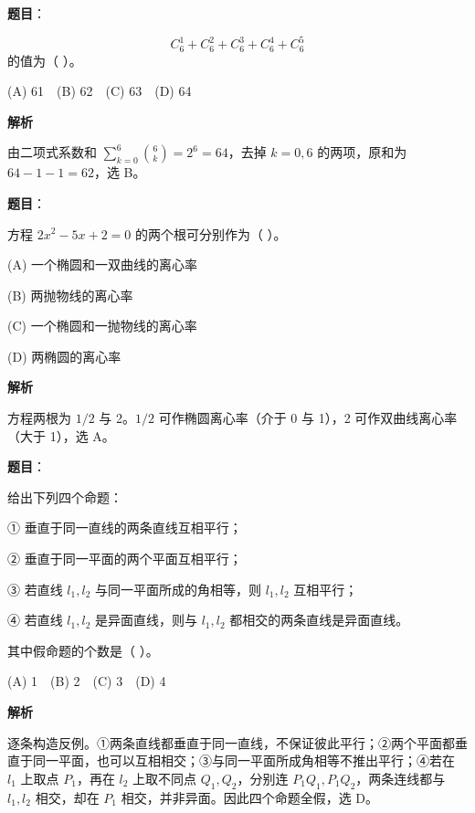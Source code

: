 \begin{answer}

\textbf{题目}：

\nopagebreak[4]
\[
C_6^1+C_6^2+C_6^3+C_6^4+C_6^5
\]
的值为（ ）。

(A) 61　(B) 62　(C) 63　(D) 64

\textbf{解析}

由二项式系数和 $\sum_{k=0}^{6}\binom6k=2^6=64$，去掉 $k=0,6$ 的两项，原和为 $64-1-1=62$，选 B。


\end{answer}
\begin{answer}

\textbf{题目}：

方程 \(2x^2-5x+2=0\) 的两个根可分别作为（ ）。

(A) 一个椭圆和一双曲线的离心率

(B) 两抛物线的离心率

(C) 一个椭圆和一抛物线的离心率

(D) 两椭圆的离心率

\textbf{解析}

方程两根为 $1/2$ 与 2。$1/2$ 可作椭圆离心率（介于 0 与 1），2 可作双曲线离心率（大于 1），选 A。


\end{answer}
\begin{answer}

\textbf{题目}：

给出下列四个命题：

① 垂直于同一直线的两条直线互相平行；

② 垂直于同一平面的两个平面互相平行；

③ 若直线 \(l_1,l_2\) 与同一平面所成的角相等，则 \(l_1,l_2\) 互相平行；

④ 若直线 \(l_1,l_2\) 是异面直线，则与 \(l_1,l_2\) 都相交的两条直线是异面直线。

其中假命题的个数是（ ）。

(A) 1　(B) 2　(C) 3　(D) 4

\textbf{解析}

逐条构造反例。①两条直线都垂直于同一直线，不保证彼此平行；②两个平面都垂直于同一平面，也可以互相相交；③与同一平面所成角相等不推出平行；④若在 $l_1$ 上取点 $P_1$，再在 $l_2$ 上取不同点 $Q_1,Q_2$，分别连 $P_1Q_1,P_1Q_2$，两条连线都与 $l_1,l_2$ 相交，却在 $P_1$ 相交，并非异面。因此四个命题全假，选 D。


\end{answer}
